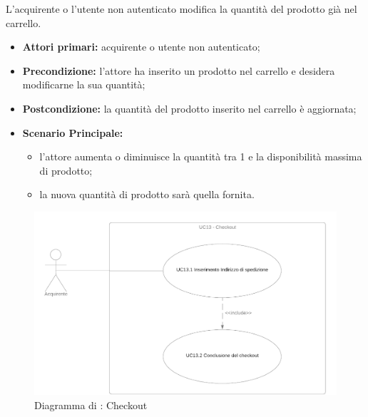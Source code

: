 
L'acquirente o l'utente non autenticato modifica la quantità del prodotto già nel carrello.
\begin{itemize}
    \item \textbf{Attori primari:} acquirente o utente non autenticato;
    \item \textbf{Precondizione:} l'attore ha inserito un prodotto nel carrello e desidera modificarne la sua quantità;
    \item \textbf{Postcondizione:} la quantità del prodotto inserito nel carrello è aggiornata;
    \item \textbf{Scenario Principale:}
        \begin{itemize}
            \item l'attore aumenta o diminuisce la quantità tra 1 e la disponibilità massima di prodotto;
            \item la nuova quantità di prodotto sarà quella fornita.
        \end{itemize}
\end{itemize}


\begin{figure}[H]
    \centering
    \includegraphics[scale=0.4]{Immagini/DiagrammiUC/UC13Checkout.png}
    \caption{Diagramma di \actualUC: Checkout} 
    \label{fig:Checkout}
\end{figure}


